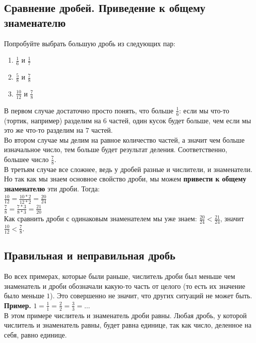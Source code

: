 \documentclass{article}
\begin{document}
\subsection{Сравнение дробей. Приведение к общему знаменателю}
Попробуйте выбрать большую дробь из следующих пар:
\begin{enumerate}
    \item $\frac 1{6}$ и $\frac1{7}$
    \item $\frac5{8}$ и $\frac7{8}$
    \item $\frac {10}{12}$ и $\frac 7{8}$
\end{enumerate}
В первом случае достаточно просто понять, что больше $\frac16$: если мы что-то (тортик, например) разделим на $6$ частей, один кусок будет больше, чем если мы это же что-то разделим на $7$ частей.\\
Во втором случае мы делим на равное количество частей, а значит чем больше изначальное число, тем больше будет результат деления. Соответственно, большее число $\frac78$.\\
В третьям случае все сложнее, ведь у дробей разные и числители, и знаменатели. Но так как мы знаем основное свойство дроби, мы можем \textbf{привести к общему знаменателю} эти дроби. Тогда: \\
$\frac{10}{12} = \frac{10*2}{12*2} = \frac{20}{24}$\\
$\frac78 =\frac{7*3}{8*3} = \frac{21}{20}$\\
Как сравнить дроби с одинаковым знаменателем мы уже знаем: $\frac{20}{24} < \frac{21}{24}$, значит $\frac{10}{12} < \frac78$.

\subsection{Правильная и неправильная дробь}
Во всех примерах, которые были раньше, числитель дроби был меньше чем знаменатель и дроби обозначали какую-то часть от целого (то есть их значение было меньше $1$). Это совершенно не значит, что других ситуаций не может быть.\\

\textbf{Пример.} $1 = \frac11 = \frac22 = \frac33 = \dots$\\
В этом примере числитель и знаменатель дроби равны. Любая дробь, у которой числитель и знаменатель равны, будет равна единице, так как число, деленное на себя, равно единице.\\
\end{document}
